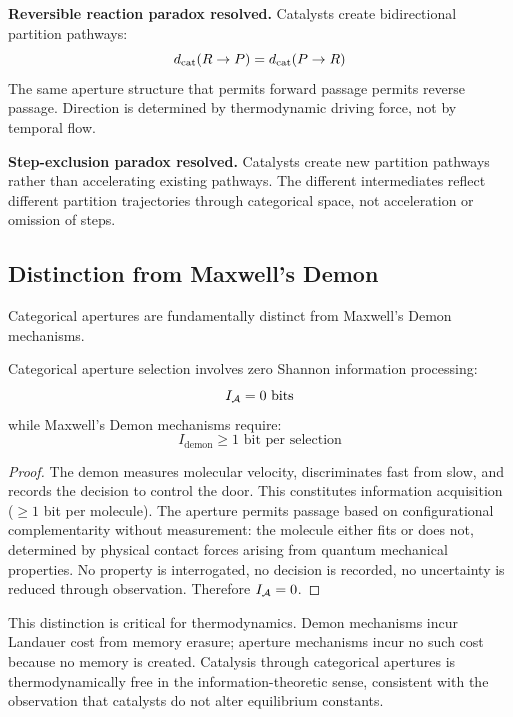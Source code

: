 \textbf{Reversible reaction paradox resolved.} Catalysts create bidirectional partition pathways:
\begin{equation}
d_{\mathrm{cat}}(R \to P) = d_{\mathrm{cat}}(P \to R)
\end{equation}
The same aperture structure that permits forward passage permits reverse passage. Direction is determined by thermodynamic driving force, not by temporal flow.

\textbf{Step-exclusion paradox resolved.} Catalysts create new partition pathways rather than accelerating existing pathways. The different intermediates reflect different partition trajectories through categorical space, not acceleration or omission of steps.

\subsection{Distinction from Maxwell's Demon}

Categorical apertures are fundamentally distinct from Maxwell's Demon mechanisms.

\begin{theorem}
\label{thm:aperture_demon}
Categorical aperture selection involves zero Shannon information processing:
\begin{equation}
I_{\mathcal{A}} = 0 \text{ bits}
\end{equation}
while Maxwell's Demon mechanisms require:
\begin{equation}
I_{\mathrm{demon}} \geq 1 \text{ bit per selection}
\end{equation}
\end{theorem}

\begin{proof}
The demon measures molecular velocity, discriminates fast from slow, and records the decision to control the door. This constitutes information acquisition ($\geq 1$ bit per molecule). The aperture permits passage based on configurational complementarity without measurement: the molecule either fits or does not, determined by physical contact forces arising from quantum mechanical properties. No property is interrogated, no decision is recorded, no uncertainty is reduced through observation. Therefore $I_{\mathcal{A}} = 0$.
\end{proof}

This distinction is critical for thermodynamics. Demon mechanisms incur Landauer cost from memory erasure; aperture mechanisms incur no such cost because no memory is created. Catalysis through categorical apertures is thermodynamically free in the information-theoretic sense, consistent with the observation that catalysts do not alter equilibrium constants.
